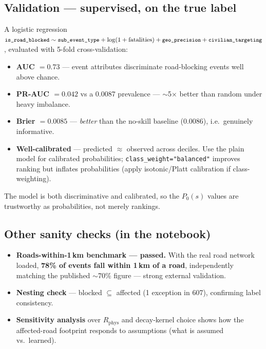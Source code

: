 \documentclass[11pt,a4paper]{article}
\newcommand{\code}[1]{\texttt{\small #1}}
\newcommand{\Rphys}{R_{\mathrm{phys}}}
\begin{document}
\subsection{Validation --- supervised, on the true label}

A logistic regression $\code{is\_road\_blocked}\sim\code{sub\_event\_type}+\log(1+\text{fatalities})
+\code{geo\_precision}+\code{civilian\_targeting}$, evaluated with 5-fold cross-validation:

\begin{itemize}[nosep,leftmargin=1.4em]
  \item \textbf{AUC $= 0.73$} --- event attributes discriminate road-blocking events well above
        chance.
  \item \textbf{PR-AUC $= 0.042$} vs a 0.0087 prevalence --- $\sim$5$\times$ better than random
        under heavy imbalance.
  \item \textbf{Brier $= 0.0085$} --- \emph{better} than the no-skill baseline (0.0086), i.e.\
        genuinely informative.
  \item \textbf{Well-calibrated} --- predicted $\approx$ observed across deciles. Use the plain
        model for calibrated probabilities; \code{class\_weight="balanced"} improves ranking but
        inflates probabilities (apply isotonic/Platt calibration if class-weighting).
\end{itemize}

The model is both discriminative and calibrated, so the $P_0(s)$ values are trustworthy as
probabilities, not merely rankings.

\subsection{Other sanity checks (in the notebook)}
\begin{itemize}[nosep,leftmargin=1.4em]
  \item \textbf{Roads-within-1\,km benchmark --- passed.} With the real road network loaded,
        \textbf{78\% of events fall within 1\,km of a road}, independently matching the
        published $\sim$70\% figure --- strong external validation.
  \item \textbf{Nesting check} --- blocked $\subseteq$ affected (1 exception in 607), confirming
        label consistency.
  \item \textbf{Sensitivity analysis} over $\Rphys$ and decay-kernel choice shows how the
        affected-road footprint responds to assumptions (what is assumed vs.\ learned).
\end{itemize}
\end{document}
